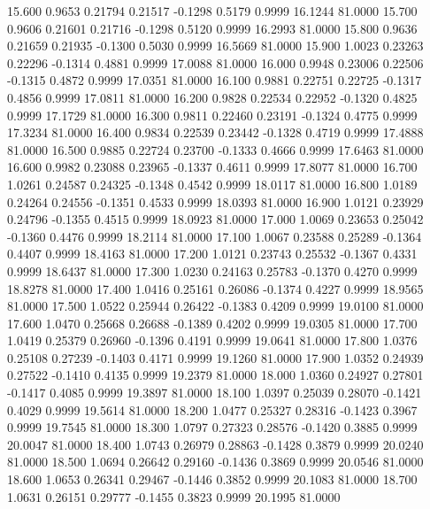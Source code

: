   15.600   0.9653   0.21794   0.21517  -0.1298   0.5179   0.9999  16.1244  81.0000
  15.700   0.9606   0.21601   0.21716  -0.1298   0.5120   0.9999  16.2993  81.0000
  15.800   0.9636   0.21659   0.21935  -0.1300   0.5030   0.9999  16.5669  81.0000
  15.900   1.0023   0.23263   0.22296  -0.1314   0.4881   0.9999  17.0088  81.0000
  16.000   0.9948   0.23006   0.22506  -0.1315   0.4872   0.9999  17.0351  81.0000
  16.100   0.9881   0.22751   0.22725  -0.1317   0.4856   0.9999  17.0811  81.0000
  16.200   0.9828   0.22534   0.22952  -0.1320   0.4825   0.9999  17.1729  81.0000
  16.300   0.9811   0.22460   0.23191  -0.1324   0.4775   0.9999  17.3234  81.0000
  16.400   0.9834   0.22539   0.23442  -0.1328   0.4719   0.9999  17.4888  81.0000
  16.500   0.9885   0.22724   0.23700  -0.1333   0.4666   0.9999  17.6463  81.0000
  16.600   0.9982   0.23088   0.23965  -0.1337   0.4611   0.9999  17.8077  81.0000
  16.700   1.0261   0.24587   0.24325  -0.1348   0.4542   0.9999  18.0117  81.0000
  16.800   1.0189   0.24264   0.24556  -0.1351   0.4533   0.9999  18.0393  81.0000
  16.900   1.0121   0.23929   0.24796  -0.1355   0.4515   0.9999  18.0923  81.0000
  17.000   1.0069   0.23653   0.25042  -0.1360   0.4476   0.9999  18.2114  81.0000
  17.100   1.0067   0.23588   0.25289  -0.1364   0.4407   0.9999  18.4163  81.0000
  17.200   1.0121   0.23743   0.25532  -0.1367   0.4331   0.9999  18.6437  81.0000
  17.300   1.0230   0.24163   0.25783  -0.1370   0.4270   0.9999  18.8278  81.0000
  17.400   1.0416   0.25161   0.26086  -0.1374   0.4227   0.9999  18.9565  81.0000
  17.500   1.0522   0.25944   0.26422  -0.1383   0.4209   0.9999  19.0100  81.0000
  17.600   1.0470   0.25668   0.26688  -0.1389   0.4202   0.9999  19.0305  81.0000
  17.700   1.0419   0.25379   0.26960  -0.1396   0.4191   0.9999  19.0641  81.0000
  17.800   1.0376   0.25108   0.27239  -0.1403   0.4171   0.9999  19.1260  81.0000
  17.900   1.0352   0.24939   0.27522  -0.1410   0.4135   0.9999  19.2379  81.0000
  18.000   1.0360   0.24927   0.27801  -0.1417   0.4085   0.9999  19.3897  81.0000
  18.100   1.0397   0.25039   0.28070  -0.1421   0.4029   0.9999  19.5614  81.0000
  18.200   1.0477   0.25327   0.28316  -0.1423   0.3967   0.9999  19.7545  81.0000
  18.300   1.0797   0.27323   0.28576  -0.1420   0.3885   0.9999  20.0047  81.0000
  18.400   1.0743   0.26979   0.28863  -0.1428   0.3879   0.9999  20.0240  81.0000
  18.500   1.0694   0.26642   0.29160  -0.1436   0.3869   0.9999  20.0546  81.0000
  18.600   1.0653   0.26341   0.29467  -0.1446   0.3852   0.9999  20.1083  81.0000
  18.700   1.0631   0.26151   0.29777  -0.1455   0.3823   0.9999  20.1995  81.0000
